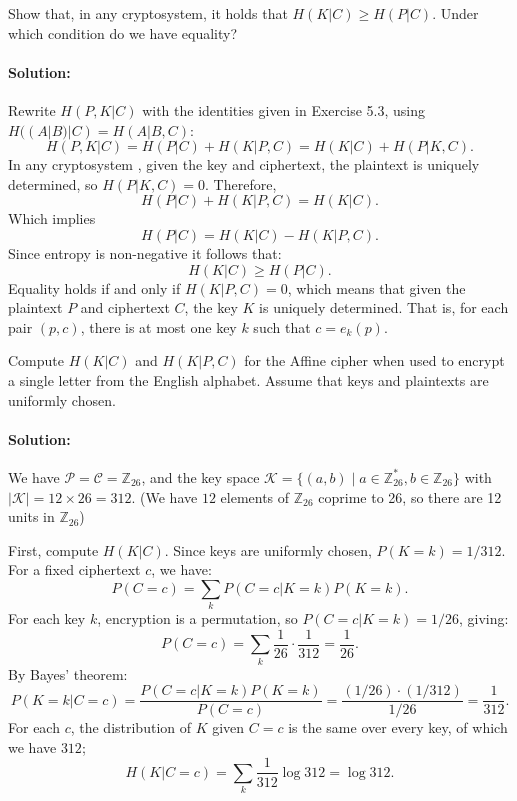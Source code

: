 \documentclass{article}
\begin{document}
\begin{exe}
Show that, in any cryptosystem, it holds that $H(K|C) \geq H(P|C)$. Under which condition do we have equality?
\end{exe}
\paragraph{Solution: }
Rewrite $H(P,K|C)$ with the identities given in Exercise 5.3, using $H((A|B)|C)=H(A|B,C)$:
\[
H(P, K | C) = H(P | C) + H(K | P, C) = H(K | C) + H(P | K, C).
\]
In any cryptosystem , given the key and ciphertext, the plaintext is uniquely determined, so $H(P | K, C) = 0$. Therefore,
\[
H(P | C) + H(K | P, C) = H(K | C).
\]
Which implies
\[
H(P | C) = H(K | C) - H(K | P, C).
\]
Since entropy is non-negative it follows that:
\[
H(K | C) \geq H(P | C).
\]
Equality holds if and only if $H(K | P, C) = 0$, which means that given the plaintext $P$ and ciphertext $C$, the key $K$ is uniquely determined. That is, for each pair $(p, c)$, there is at most one key $k$ such that $c = e_k(p)$.

\begin{exe}
 Compute $H(K|C)$ and $ H(K|P, C)$ for the Affine cipher when used to encrypt a single letter from the English alphabet. Assume that keys and plaintexts are uniformly chosen.
\end{exe}
\paragraph{Solution: }
We have $\mathcal{P} = \mathcal{C} = \mathbb{Z}_{26}$, and the key space $\mathcal{K} = \{(a, b) \mid a \in \mathbb{Z}_{26}^*, b \in \mathbb{Z}_{26}\}$ with $|\mathcal{K}| = 12 \times 26 = 312$. (We have $12$ elements of $\mathbb{Z}_{26}$ coprime to 26, so there are 12 units in $\mathbb{Z}_{26}$)

First, compute $H(K|C)$. Since keys are uniformly chosen, $P(K=k) = 1/312$. For a fixed ciphertext $c$, we have:
\[
P(C=c) = \sum_{k} P(C=c | K=k) P(K=k).
\]
For each key $k$, encryption is a permutation, so $P(C=c | K=k) = 1/26$, giving:
\[
P(C=c) = \sum_{k} \frac{1}{26} \cdot \frac{1}{312} = \frac{1}{26}.
\]
By Bayes' theorem:
\[
P(K=k | C=c) = \frac{P(C=c | K=k) P(K=k)}{P(C=c)} = \frac{(1/26) \cdot (1/312)}{1/26} = \frac{1}{312}.
\]
For each $c$, the distribution of $K$ given $C=c$ is the same over every key, of which we have $312$;
\[
H(K | C=c) = \sum_{k} \frac{1}{312} \log 312 = \log 312.
\]
\end{document}
